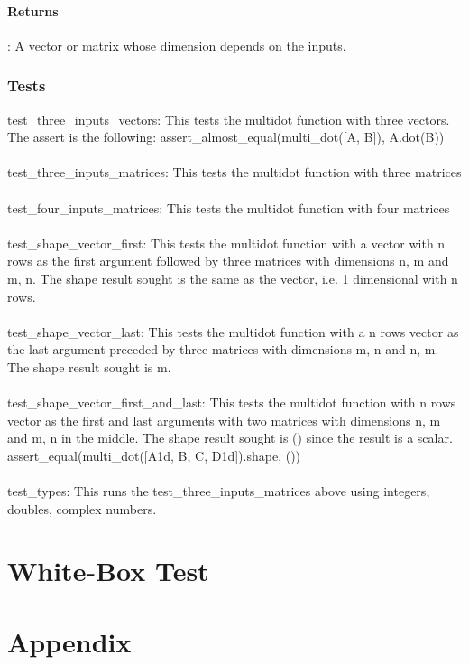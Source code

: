 \documentclass[a4paper,11pt]{article}
\begin{document}
\paragraph{Returns}: A vector or matrix whose dimension depends on the inputs. 
\subsubsection{Tests}
test\_three\_inputs\_vectors: This tests the multidot function with three vectors. The assert is the following: assert\_almost\_equal(multi\_dot([A, B]), A.dot(B))\\
\\
test\_three\_inputs\_matrices: This tests the multidot function with three matrices\\
\\
test\_four\_inputs\_matrices: This tests the multidot function with four matrices\\
\\
test\_shape\_vector\_first: This tests the multidot function with a vector with n rows as the first argument followed by three matrices with dimensions n, m and m, n. The shape result sought is the same as the vector, i.e. 1 dimensional with n rows. \\
\\
test\_shape\_vector\_last: This tests the multidot function with a n rows vector as the last argument preceded by three matrices with dimensions m, n and n, m. The shape result sought is m. \\
\\
test\_shape\_vector\_first\_and\_last: This tests the multidot function with n rows vector as the first and last arguments with two matrices with dimensions n, m and m, n in the middle. The shape result sought is () since the result is a scalar. assert\_equal(multi\_dot([A1d, B, C, D1d]).shape, ())\\
\\
test\_types: This runs the test\_three\_inputs\_matrices above using integers, doubles, complex numbers. 


\section{White-Box Test}



\section{Appendix}
\end{document}
